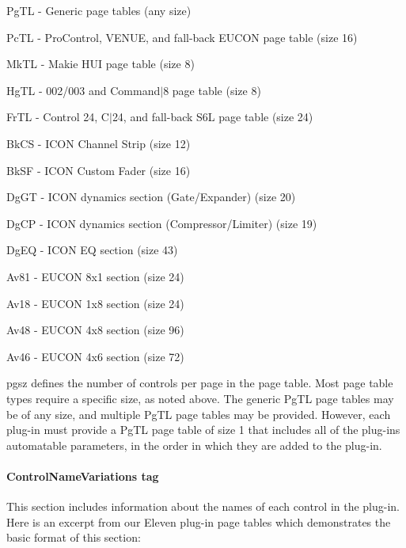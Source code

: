 \begin{DoxyItemize}
\begin{DoxyItemize}
\begin{DoxyEnumerate}
\begin{DoxyItemize}
\item {\ttfamily Pg\+TL} -\/ Generic page tables (any size) 
\item {\ttfamily Pc\+TL} -\/ Pro\+Control, V\+E\+N\+UE, and fall-\/back E\+U\+C\+ON page table (size 16) 
\item {\ttfamily Mk\+TL} -\/ Makie H\+UI page table (size 8) 
\item {\ttfamily Hg\+TL} -\/ 002/003 and Command$\vert$8 page table (size 8) 
\item {\ttfamily Fr\+TL} -\/ Control 24, C$\vert$24, and fall-\/back S6L page table (size 24) 
\item {\ttfamily Bk\+CS} -\/ I\+C\+ON Channel Strip (size 12) 
\item {\ttfamily Bk\+SF} -\/ I\+C\+ON Custom Fader (size 16) 
\item {\ttfamily Dg\+GT} -\/ I\+C\+ON dynamics section (Gate/\+Expander) (size 20) 
\item {\ttfamily Dg\+CP} -\/ I\+C\+ON dynamics section (Compressor/\+Limiter) (size 19) 
\item {\ttfamily Dg\+EQ} -\/ I\+C\+ON EQ section (size 43) 
\item {\ttfamily Av81} -\/ E\+U\+C\+ON 8x1 section (size 24) 
\item {\ttfamily Av18} -\/ E\+U\+C\+ON 1x8 section (size 24) 
\item {\ttfamily Av48} -\/ E\+U\+C\+ON 4x8 section (size 96) 
\item {\ttfamily Av46} -\/ E\+U\+C\+ON 4x6 section (size 72)
\end{DoxyItemize}


\item {\ttfamily pgsz} defines the number of controls per page in the page table. Most page table types require a specific size, as noted above. The generic {\ttfamily Pg\+TL} page tables may be of any size, and multiple {\ttfamily Pg\+TL} page tables may be provided. However, each plug-\/in must provide a {\ttfamily Pg\+TL} page table of size 1 that includes all of the plug-\/in\textquotesingle{}s automatable parameters, in the order in which they are added to the plug-\/in.  
\end{DoxyEnumerate}
\end{DoxyItemize}
\end{DoxyItemize}

\hypertarget{a00833_subsubsection_controlnamesvariations_tag}{}\paragraph{Control\+Name\+Variations tag}\label{a00833_subsubsection_controlnamesvariations_tag}
This section includes information about the names of each control in the plug-\/in. Here is an excerpt from our Eleven plug-\/in page tables which demonstrates the basic format of this section\+:



